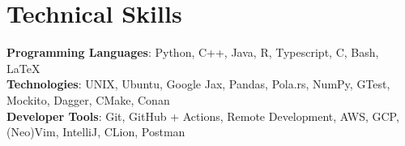 \documentclass[letterpaper,11pt]{article}
\begin{document}
\section{Technical Skills}
 \begin{itemize}[leftmargin=0.15in, label={}]
    \small{\item{
     \textbf{Programming Languages}{: Python, C++, Java, R, Typescript, C, Bash, \LaTeX} \\
     \textbf{Technologies}{: UNIX, Ubuntu, Google Jax, Pandas, Pola.rs, NumPy, GTest, Mockito, Dagger, CMake, Conan } \\
    \textbf{Developer Tools}{: Git, GitHub + Actions, Remote Development, AWS, GCP, (Neo)Vim, IntelliJ, CLion, Postman} \\
    }}
 \end{itemize}
\end{document}
